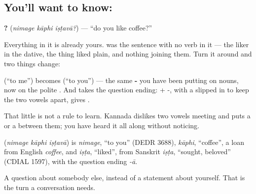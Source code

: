 \subsection*{You'll want to know:   }
\textbf{  ?} (\emph{nimage kāphi iṣṭavā?}) — \textquotedblleft{}do you like coffee?\textquotedblright{}

Everything in it is already yours.    was the sentence with no verb in it — the liker in the dative, the thing liked plain, and nothing joining them. Turn it around and two things change:

 (\textquotedblleft{}to me\textquotedblright{}) becomes  (\textquotedblleft{}to you\textquotedblright{}) — the same \textbf{-} you have been putting on nouns, now on the polite . And  takes the question ending:  + -, with a  slipped in to keep the two vowels apart, gives .

That little  is not a rule to learn. Kannada dislikes two vowels meeting and puts a  or a  between them; you have heard it all along without noticing.

\begin{cousinweb}
\textbf{  } (\emph{nimage kāphi iṣṭavā}) is \emph{nimage}, \textquotedblleft{}to you\textquotedblright{} (DEDR 3688), \emph{kāphi}, \textquotedblleft{}coffee\textquotedblright{}, a loan from English \emph{coffee}, and \emph{iṣṭa}, \textquotedblleft{}liked\textquotedblright{}, from Sanskrit \emph{iṣṭa}, \textquotedblleft{}sought, beloved\textquotedblright{} (CDIAL 1597), with the question ending \emph{-ā}.
\end{cousinweb}

\begin{grammarlens}[title={What you've built}]
A question about somebody else, instead of a statement about yourself. That is the turn a conversation needs.
\end{grammarlens}

